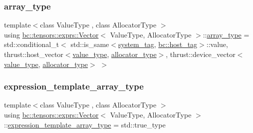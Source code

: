 \mbox{\label{structbc_1_1tensors_1_1exprs_1_1Vector_a73521248268e63ecefe36bca57afcf20}} 
\subsubsection{\texorpdfstring{array\+\_\+type}{array\_type}}
{\footnotesize\ttfamily template$<$class Value\+Type , class Allocator\+Type $>$ \\
using \hyperlink{structbc_1_1tensors_1_1exprs_1_1Vector}{bc\+::tensors\+::exprs\+::\+Vector}$<$ Value\+Type, Allocator\+Type $>$\+::\hyperlink{structbc_1_1tensors_1_1exprs_1_1Vector_a73521248268e63ecefe36bca57afcf20}{array\+\_\+type} =  std\+::conditional\+\_\+t$<$ std\+::is\+\_\+same$<$\hyperlink{structbc_1_1tensors_1_1exprs_1_1Vector_a828fecb38556a2bd72fc88dab4eb9bfe}{system\+\_\+tag}, \hyperlink{structbc_1_1host__tag}{bc\+::host\+\_\+tag}$>$\+::value, thrust\+::host\+\_\+vector$<$\hyperlink{structbc_1_1tensors_1_1exprs_1_1Vector_a61ba759af8b26329103ce2b0765dade5}{value\+\_\+type}, \hyperlink{structbc_1_1tensors_1_1exprs_1_1Vector_a94fd93f892cde60396b78ab67b180a19}{allocator\+\_\+type}$>$, thrust\+::device\+\_\+vector$<$\hyperlink{structbc_1_1tensors_1_1exprs_1_1Vector_a61ba759af8b26329103ce2b0765dade5}{value\+\_\+type}, \hyperlink{structbc_1_1tensors_1_1exprs_1_1Vector_a94fd93f892cde60396b78ab67b180a19}{allocator\+\_\+type}$>$ $>$}

\mbox{\label{structbc_1_1tensors_1_1exprs_1_1Vector_a7a30191739439f338f709feca776585b}} 
\subsubsection{\texorpdfstring{expression\+\_\+template\+\_\+array\+\_\+type}{expression\_template\_array\_type}}
{\footnotesize\ttfamily template$<$class Value\+Type , class Allocator\+Type $>$ \\
using \hyperlink{structbc_1_1tensors_1_1exprs_1_1Vector}{bc\+::tensors\+::exprs\+::\+Vector}$<$ Value\+Type, Allocator\+Type $>$\+::\hyperlink{structbc_1_1tensors_1_1exprs_1_1Vector_a7a30191739439f338f709feca776585b}{expression\+\_\+template\+\_\+array\+\_\+type} =  std\+::true\+\_\+type}

